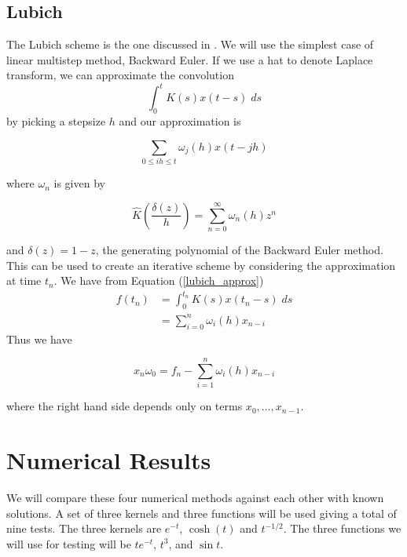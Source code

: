 \documentclass[11pt]{article}
\numberwithin{equation}{section}
\theoremstyle{definition}
\newcommand{\eqn}[2]{
  \begin{equation}
    \label{#1}
    #2
  \end{equation}
}
\newcommand{\eqr}[1]{Equation (\ref{#1})}
\begin{document}
\subsection{Lubich}
The Lubich scheme is the one discussed in \cite{lubich}. We will use the simplest
case of linear multistep method, Backward Euler. If we use a hat to denote Laplace
transform, we can approximate the convolution
$$
  \int_0^t K(s) x(t - s)\; ds
$$
by picking a stepsize $h$ and our approximation is
\eqn{lubich_approx}{
  \sum_{0 \leq ih \leq t} \omega_j(h) x(t - jh)
}
where $\omega_n$ is given by
\eqn{lubich_omega}{
  \hat{K}\left(\frac{\delta(z)}{h}\right) = \sum_{n=0}^\infty \omega_n(h) z^n
}
and $\delta(z) = 1-z$, the generating polynomial of the Backward Euler method.
This can be used to create an iterative scheme by considering the approximation
at time $t_n$. We have from \eqr{lubich_approx}
\begin{align}
\nonumber  f(t_n)
                  &= \int_0^{t_n} K(s) x(t_n - s)\; ds \\
                  &= \sum_{i=0}^{n} \omega_i(h) x_{n-i}
\end{align}
Thus we have
\eqn{lubich_scheme}{
  x_n \omega_0 = f_n - \sum_{i=1}^n \omega_i(h) x_{n-i}
}
where the right hand side depends only on terms $x_0, ..., x_{n-1}$.
\section{Numerical Results}
We will compare these four numerical methods against each other with known solutions.
A set of three kernels and three functions will be used giving a total of nine tests.
The three kernels are $e^{-t}$, $\cosh(t)$ and $t^{-1/2}$. The three functions we
will use for testing will be $te^{-t}$, $t^3$, and $\sin t$.
\end{document}
